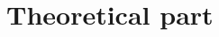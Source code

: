 \documentclass[../thesis.tex]{subfiles}
\begin{document}
\edef\folder{\currfolder /part1}

\part{Theoretical part}
\label{part:1}

\end{document}

